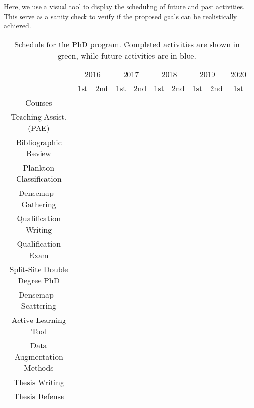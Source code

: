 Here, we use a visual tool to display the scheduling of future and past activities. This serve as a sanity check to verify if the
proposed goals can be realistically achieved.

\begin{table}[ht!]
  \center
  \begin{tabular}{|c|c|c|c|c|c|c|c|c|c|}\hline
    & \multicolumn{2}{c|}{2016} & \multicolumn{2}{c|}{2017} & \multicolumn{2}{c|}{2018} & \multicolumn{2}{c|}{2019} & \multicolumn{1}{c|}{2020} \\ \cline{2-10}
    \raisebox{1.5ex}{Activity} & 1st & 2nd & 1st & 2nd & 1st & 2nd & 1st & 2nd & 1st \\ \hline \hline
    Courses & \cellcolor{green!25} & \cellcolor{green!25} &  &  &  &  & & & \\ \hline
    Teaching Assist. (PAE) & & & \cellcolor{green!25} &  &  &  & & & \\ \hline
    Bibliographic Review & \cellcolor{green!25} & \cellcolor{green!25} & \cellcolor{green!25} & \cellcolor{green!25} & \cellcolor{green!25} & \cellcolor{blue!25} & \cellcolor{blue!25} & \cellcolor{blue!25} & \\ \hline 
    Plankton Classification & & & \cellcolor{green!25} & \cellcolor{green!25} &  & & &  & \\ \hline
    Densemap - Gathering & & & &  & \cellcolor{green!25}  & & &  & \\ \hline
    Qualification Writing & & & & & \cellcolor{green!25} & &  & & \\ \hline
    Qualification Exam & & & & & \cellcolor{green!25} & & & & \\ \hline
    Split-Site Double Degree PhD & & & & & & \cellcolor{blue!25} & \cellcolor{blue!25} & & \\ \hline
    Densemap - Scattering & & & &  & & \cellcolor{blue!25} & &  & \\ \hline
    Active Learning Tool & & & &  & &  & \cellcolor{blue!25} &  & \\ \hline
    Data Augmentation Methods & & & &  & &  & & \cellcolor{blue!25} & \\ \hline
    Thesis Writing & & & & & & & & \cellcolor{blue!25} & \\ \hline
    Thesis Defense & & & & & & & & & \cellcolor{blue!25}  \\ \hline
  \end{tabular}
  \caption{Schedule for the PhD program. Completed activities are shown in green, while future activities are in blue.}
  \label{tab:schedule}
\end{table}